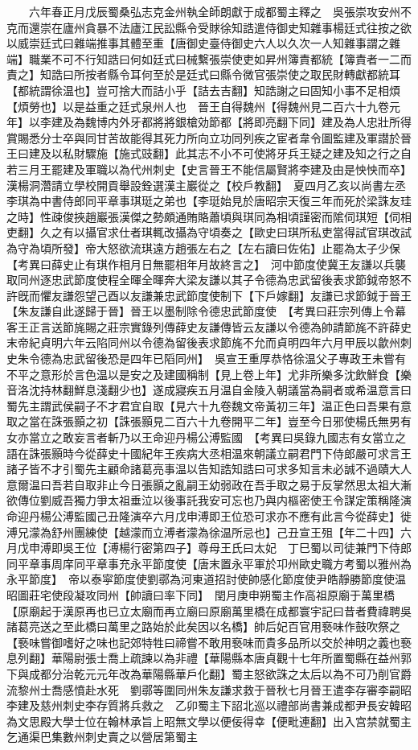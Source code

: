 　　六年春正月戊辰蜀桑弘志克金州執全師朗獻于成都蜀主釋之　吳張崇攻安州不克而還崇在廬州貪暴不法廬江民訟縣令受賕徐知誥遣侍御史知雜事楊廷式往按之欲以威崇廷式曰雜端推事其體至重【唐御史臺侍御史六人以久次一人知雜事謂之雜端】職業不可不行知誥曰何如廷式曰械繫張崇使吏如昇州簿責都統【簿責者一二而責之】知誥曰所按者縣令耳何至於是廷式曰縣令微官張崇使之取民財轉獻都統耳【都統謂徐温也】豈可捨大而詰小乎【詰去吉翻】知誥謝之曰固知小事不足相煩【煩勞也】以是益重之廷式泉州人也　晉王自得魏州【得魏州見二百六十九卷元年】以李建及為魏博内外牙都將將銀槍効節都【將即亮翻下同】建及為人忠壯所得賞賜悉分士卒與同甘苦故能得其死力所向立功同列疾之宦者韋令圖監建及軍譛於晉王曰建及以私財驟施【施式豉翻】此其志不小不可使將牙兵王疑之建及知之行之自若三月王罷建及軍職以為代州刺史【史言晉王不能信屬賢將李建及由是怏怏而卒】　漢楊洞濳請立學校開貢舉設銓選漢主巖從之【校戶教翻】　夏四月乙亥以尚書左丞李琪為中書侍郎同平章事琪珽之弟也【李珽始見於唐昭宗天復三年而死於梁誅友珪之時】性疎俊挾趙巖張漢傑之勢頗通賄賂蕭頃與琪同為相頃謹密而隂伺琪短【伺相吏翻】久之有以攝官求仕者琪輒改攝為守頃奏之【歐史曰琪所私吏當得試官琪改試為守為頃所發】帝大怒欲流琪遠方趙張左右之【左右讀曰佐佑】止罷為太子少保　【考異曰薛史止有琪作相月日無罷相年月故終言之】　河中節度使冀王友謙以兵襲取同州逐忠武節度使程全暉全暉奔大梁友謙以其子令德為忠武留後表求節鉞帝怒不許旣而懼友謙怨望己酉以友謙兼忠武節度使制下【下戶嫁翻】友謙已求節鉞于晉王【朱友謙自此遂歸于晉】晉王以墨制除令德忠武節度使　【考異曰莊宗列傳上令幕客王正言送節旄賜之莊宗實錄列傳薛史友謙傳皆云友謙以令德為帥請節旄不許薛史末帝紀貞明六年云陷同州以令德為留後表求節旄不允而貞明四年六月甲辰以歙州刺史朱令德為忠武留後恐是四年已䧟同州】　吳宣王重厚恭恪徐温父子專政王未嘗有不平之意形於言色温以是安之及建國稱制【見上卷上年】尤非所樂多沈飲鮮食【樂音洛沈持林翻鮮息淺翻少也】遂成寢疾五月温自金陵入朝議當為嗣者或希温意言曰蜀先主謂武侯嗣子不才君宜自取【見六十九卷魏文帝黃初三年】温正色曰吾果有意取之當在誅張顥之初【誅張顥見二百六十九卷開平二年】豈至今日邪使楊氏無男有女亦當立之敢妄言者斬乃以王命迎丹楊公溥監國　【考異曰吳錄九國志有女當立之語在誅張顥時今從薛史十國紀年王疾病大丞相温來朝議立嗣君門下侍郎嚴可求言王諸子皆不才引蜀先主顧命諸葛亮事温以告知誥知誥曰可求多知言未必誠不過賾大人意爾温曰吾若自取非止今日張顥之亂嗣王幼弱政在吾手取之易于反掌然思太祖大漸欲傳位劉威吾獨力爭太祖垂泣以後事託我安可忘也乃與内樞密使王令謀定策稱隆演命迎丹楊公溥監國己丑隆演卒六月戊申溥即王位恐可求亦不應有此言今從薛史】徙溥兄濛為舒州團練使【越濛而立溥者濛為徐温所忌也】己丑宣王殂【年二十四】六月戊申溥即吳王位【溥楊行密第四子】尊母王氏曰太妃　丁巳蜀以司徒兼門下侍郎同平章事周庠同平章事充永平節度使【唐末置永平軍於卭州歐史職方考蜀以雅州為永平節度】　帝以泰寜節度使劉鄩為河東道招討使帥感化節度使尹皓靜勝節度使温昭圖莊宅使段凝攻同州【帥讀曰率下同】　閏月庚申朔蜀主作高祖原廟于萬里橋【原廟起于漢原再也已立太廟而再立廟曰原廟萬里橋在成都寰宇記曰昔者費禕聘吳諸葛亮送之至此橋曰萬里之路始於此矣因以名橋】帥后妃百官用䙝味作鼓吹祭之【䙝味嘗御嗜好之味也記郊特牲曰禘嘗不敢用䙝味而貴多品所以交於神明之義也䙝息列翻】華陽尉張士喬上疏諫以為非禮【華陽縣本唐貞觀十七年所置蜀縣在益州郭下與成都分治乾元元年改為華陽縣華戶化翻】蜀主怒欲誅之太后以為不可乃削官爵流黎州士喬感憤赴水死　劉鄩等圍同州朱友謙求救于晉秋七月晉王遣李存審李嗣昭李建及慈州刺史李存質將兵救之　乙卯蜀主下詔北巡以禮部尚書兼成都尹長安韓昭為文思殿大學士位在翰林承旨上昭無文學以便佞得幸【便毗連翻】出入宫禁就蜀主乞通渠巴集數州刺史賣之以營居第蜀主
